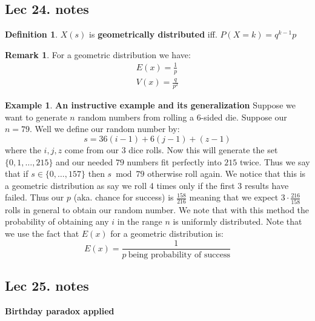 \documentclass[titlepage]{article}
\theoremstyle{definition}
\newtheorem{example}{Example}
\newtheorem{remark}{Remark}
\newtheorem{definition}{Definition}
\numberwithin{equation}{subsection}
\numberwithin{remark}{subsection}
\begin{document}
\subsection{Lec 24. notes}
\begin{definition}
$X(s)$ is \textbf{geometrically distributed} iff. $P(X = k) = q^{k-1}p$
\end{definition}

\begin{remark}
For a geometric distribution we have:
\begin{align*}
    E(x) = \frac{1}{p}\\
    V(x) = \frac{q}{p^{2}}
\end{align*}
\end{remark}

\begin{example}\textbf{An instructive example and its generalization}
Suppose we want to generate $n$ random numbers from rolling a 6-sided die. Suppose our $n=79$. Well we define our random number by:
$$s = 36(i-1) + 6(j-1) + (z-1)$$
where the $i,j,z$ come from our 3 dice rolls. Now this will generate the set $\{0,1, \hdots, 215\}$ and our needed $79$ numbers fit perfectly into $215$ twice. Thus we say that if $s \in \{0,\hdots,157\}$ then $s \bmod{79}$ otherwise roll again. We notice that this is a geometric distribution as say we roll 4 times only if the first 3 results have failed. Thus our $p$ (aka. chance for success) is $\frac{158}{216}$ meaning that we expect $3 \cdot \frac{216}{158}$ rolls in general to obtain our random number. We note that with this method the probability of obtaining any $i$ in the range $n$ is uniformly distributed. Note that we use the fact that $E(x)$ for a geometric distribution is:
$$E(x) = \frac{1}{p \ \text{being probability of success}}$$
\end{example}

\subsection{Lec 25. notes}

\textbf{Birthday paradox applied}
\\
\end{document}
